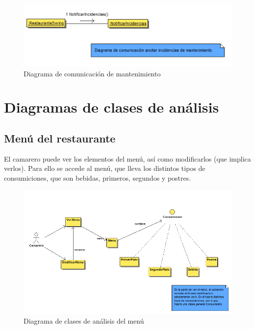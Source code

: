 \documentclass[spanish,a4paper,11pt, twoside]{report}	%
\begin{document}
		\begin{figure}[!h]
		\centering
		\includegraphics[scale=0.5]{DCanotarincidencias.png}
		\caption{Diagrama de comunicación de mantenimiento}
		\end{figure}





	\section{Diagramas de clases de análisis}
		\subsection{Menú del restaurante}
		El camarero puede ver los elementos del menú, así como modificarlos (que implica verlos). Para ello se accede al menú, que lleva los distintos tipos de consumiciones, que son bebidas, primeros, segundos y postres.
		\begin{figure}[!h]
		\centering
		\includegraphics[scale=0.5]{DCAmenu.png}
		\caption{Diagrama de clases de análisis del menú}
		\end{figure}
\end{document}
